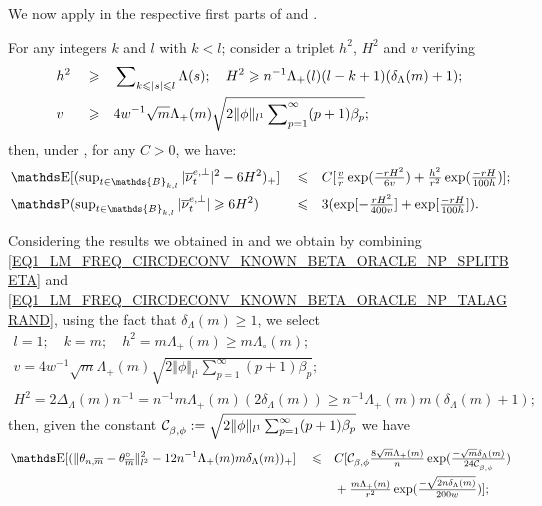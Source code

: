 We now apply  in the respective first parts of  and .

\begin{lm}\label{LM_FREQ_CIRCDECONV_KNOWN_BETA_ORACLE_NP_TALAGRAND}
For any integers $k$ and $l$ with $k < l$; consider a triplet $h^{2}$, $H^{2}$ and $v$ verifying
\begin{alignat*}{3}
& h^{2} && \geqslant &&\sum\nolimits_{k \leqslant \vert s \vert \leqslant l} \Lambda(s);\quad H^{2} \geqslant n^{-1}\Lambda_{+}(l)(l-k+1)( \delta_{\Lambda}(m) + 1);\\
& v && \geqslant &&4w^{-1} \sqrt{m} \Lambda_{+}(m) \sqrt{2 \Vert \phi \Vert_{l^{1}} \sum\nolimits_{p = 1}^{\infty} (p + 1)\beta_{p}};
\end{alignat*}
then, under , for any $C > 0$, we have:
\begin{alignat}{3}
& \E [ (\sup\nolimits_{t \in \mathds{B}_{k, l}}\vert \overline{\nu}^{e, \perp}_{t} \vert^{2} - 6 H^{2} )_{+} ] && \leq && C [\tfrac{v}{r} \exp (\tfrac{-r H^{2}}{6 v} ) + \tfrac{h^{2}}{r^{2}} \exp (\tfrac{- r H}{100 h} ) ];\label{EQ1_LM_FREQ_CIRCDECONV_KNOWN_BETA_ORACLE_NP_TALAGRAND}\\
& \P (\sup\nolimits_{t \in \mathds{B}_{k, l}} \vert \overline{\nu}^{e, \perp}_{t} \vert \geq 6 H^{2} ) && \leq && 3  (\exp [- \tfrac{r H^{2}}{400 v} ] + \exp [ \tfrac{-r H}{100 h} ] )\label{EQ2_LM_FREQ_CIRCDECONV_KNOWN_BETA_ORACLE_NP_TALAGRAND}.
\end{alignat}
\reEnd
\end{lm}

Considering the results we obtained in  and  we obtain by combining \ref{EQ1_LM_FREQ_CIRCDECONV_KNOWN_BETA_ORACLE_NP_SPLITBETA} and \ref{EQ1_LM_FREQ_CIRCDECONV_KNOWN_BETA_ORACLE_NP_TALAGRAND}, using the fact that $\delta_{\Lambda}(m) \geq 1$, we select
\begin{multline*}
l = 1; \quad k = m; \quad h^{2} = m \Lambda_{+}(m) \geq m \Lambda_{\circ}(m);\\
v = 4w^{-1} \sqrt{m} \Lambda_{+}(m) \sqrt{2 \Vert \phi \Vert_{l^{1}} \sum\nolimits_{p = 1}^{\infty} (p + 1)\beta_{p}};\\
H^{2} = 2 \Delta_{\Lambda}(m) n^{-1} = n^{-1} m \Lambda_{+}(m) (2\delta_{\Lambda}(m))\geq n^{-1} \Lambda_{+}(m) m (\delta_{\Lambda}(m) + 1);
\end{multline*}
then, given the constant ${\mathcal C}^{}_{\beta, \phi} := \sqrt{2 \Vert \phi \Vert_{l^{1}} \sum_{p = 1}^{\infty} (p + 1)\beta_{p}}$ we have
\begin{alignat*}{3}
& \E [ (\Vert \theta_{n, \overline{m}} - \theta^{\circ}_{\overline{m}} \Vert_{l^{2}}^{2} - 12 n^{-1}\Lambda_{+}(m)m \cmiSv )_{+} ] && \leq && C [\cst{\beta, \phi} \tfrac{8 \sqrt{m} \Lambda_{+}(m)}{n} \exp (\tfrac{- \sqrt{m} \cmiSv}{24 \cst{\beta, \phi}} )\\
& && &&+ \tfrac{m \Lambda_{+}(m)}{r^{2}} \exp (\tfrac{- \sqrt{2 n \cmiSv}}{200 w} ) ];
\end{alignat*}

